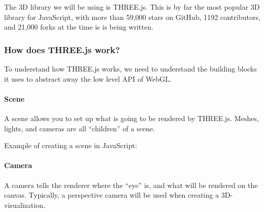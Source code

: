 The 3D library we will be using is THREE.js. This is by far the most
popular 3D library for JavaScript, with more than 59,000 stars on
GitHub, 1192 contributors, and 21,000 forks at the time is is being
written.

\hypertarget{how-does-three.js-work}{%
\subsubsection{How does THREE.js work?}\label{how-does-three.js-work}}

To understand how THREE.js works, we need to understand the building
blocks it uses to abstract away the low level API of WebGL.

\hypertarget{scene}{%
\paragraph{Scene}\label{scene}}

A scene allows you to set up what is going to be rendered by THREE.js.
Meshes, lights, and cameras are all ``children'' of a scene.

Example of creating a scene in JavaScript:

\begin{Shaded}
\begin{Highlighting}[]
 \OperatorTok{*}  
\OperatorTok{=}  \NormalTok{()}
\end{Highlighting}
\end{Shaded}

\hypertarget{camera}{%
\paragraph{Camera}\label{camera}}

A camera tells the renderer where the ``eye'' is, and what will be
rendered on the canvas. Typically, a perspective camera will be used
when creating a 3D-visualization.

